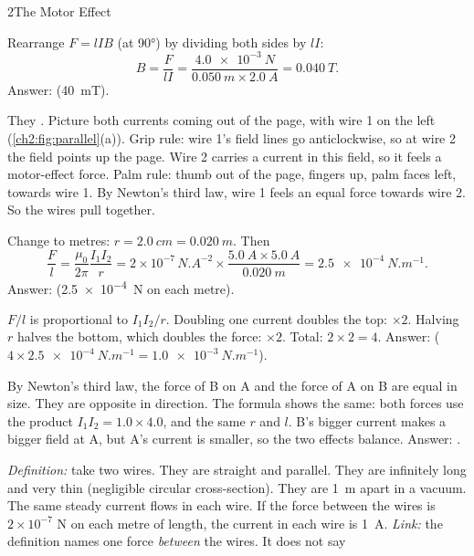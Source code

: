 \begin{chapteranswers}{2}{The Motor Effect}
  \item Rearrange $F = lIB$ (at \ang{90}) by dividing both sides by $lI$:
        \[ B = \frac{F}{lI} = \frac{\qty{4.0e-3}{N}}{\qty{0.050}{m} \times \qty{2.0}{A}}
        = \qty{0.040}{T}. \]
        Answer:  (\qty{40}{mT}).
  \item They . Picture both currents coming out of the page, with wire 1 on the
        left (\cref{ch2:fig:parallel}(a)). Grip rule: wire 1's field lines go anticlockwise, so at
        wire 2 the field points up the page. Wire 2 carries a current in this field, so it feels a
        motor-effect force. Palm rule: thumb out of the page, fingers up, palm faces left, towards
        wire 1. By Newton's third law, wire 1 feels an equal force towards wire 2. So the wires
        pull together.
  \item Change to metres: $r = \qty{2.0}{cm} = \qty{0.020}{m}$. Then
        \[ \frac{F}{l} = \frac{\mu_0}{2\pi}\frac{I_1 I_2}{r} = 2 \times 10^{-7}\,\unit{N.A^{-2}}
        \times \frac{\qty{5.0}{A} \times \qty{5.0}{A}}{\qty{0.020}{m}} = \qty{2.5e-4}{N.m^{-1}}. \]
        Answer:  (\qty{2.5e-4}{N} on each metre).
  \item $F/l$ is proportional to $I_1 I_2 / r$. Doubling one current doubles the top: $\times 2$.
        Halving $r$ halves the bottom, which doubles the force: $\times 2$. Total:
        $2 \times 2 = 4$. Answer: 
        ($4 \times \qty{2.5e-4}{N.m^{-1}} = \qty{1.0e-3}{N.m^{-1}}$).
  \item By Newton's third law, the force of B on A and the force of A on B are equal in size.
        They are opposite in direction. The formula shows the same: both forces use the product
        $I_1 I_2 = 1.0 \times 4.0$, and the same $r$ and $l$. B's bigger current makes a bigger
        field at A, but A's current is smaller, so the two effects balance. Answer:
        .
  \item \emph{Definition:} take two wires. They are straight and parallel. They are infinitely
        long and very thin (negligible circular cross-section). They are \qty{1}{m} apart in a
        vacuum. The same steady current flows in each wire. If the force between the wires is $2 \times 10^{-7}$ N on each metre of length, the
        current in each wire is \qty{1}{A}.
        \emph{Link:} the definition names one force \emph{between} the wires. It does not say

\end{chapteranswers}

